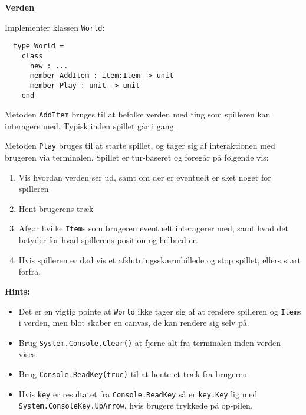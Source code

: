 \textbf{Verden}

Implementer klassen \lstinline{World}:

\begin{lstlisting}
  type World =
    class
      new : ...
      member AddItem : item:Item -> unit
      member Play : unit -> unit
    end
\end{lstlisting}

Metoden \lstinline{AddItem} bruges til at befolke verden med ting som spilleren
kan interagere med. Typisk inden spillet går i gang.

Metoden \lstinline{Play} bruges til at starte spillet, og tager sig af
interaktionen med brugeren via terminalen. Spillet er tur-baseret og
foregår på følgende vis:
\begin{enumerate}
\item Vis hvordan verden ser ud, samt om der er eventuelt er sket
  noget for spilleren
\item Hent brugerens træk
\item Afgør hvilke \lstinline{Item}s som brugeren eventuelt interagerer med,
  samt hvad det betyder for hvad spillerens position og helbred er.
\item Hvis spilleren er død vis et afslutningsskærmbillede og stop
  spillet, ellers start forfra.
\end{enumerate}

\textbf{Hints:}
\begin{itemize}
\item Det er en vigtig pointe at \lstinline{World} ikke tager sig af at rendere
  spilleren og \lstinline{Item}s i verden, men blot skaber en canvas, de kan
  rendere sig selv på.
\item Brug \lstinline{System.Console.Clear()} at fjerne alt fra terminalen inden
  verden vises.
\item Brug \lstinline{Console.ReadKey(true)} til at hente et træk fra brugeren
\item Hvis \lstinline{key} er resultatet fra \lstinline{Console.ReadKey} så er \lstinline{key.Key}
  lig med \lstinline{System.ConsoleKey.UpArrow}, hvis brugere trykkede på
  op-pilen.
\end{itemize}


